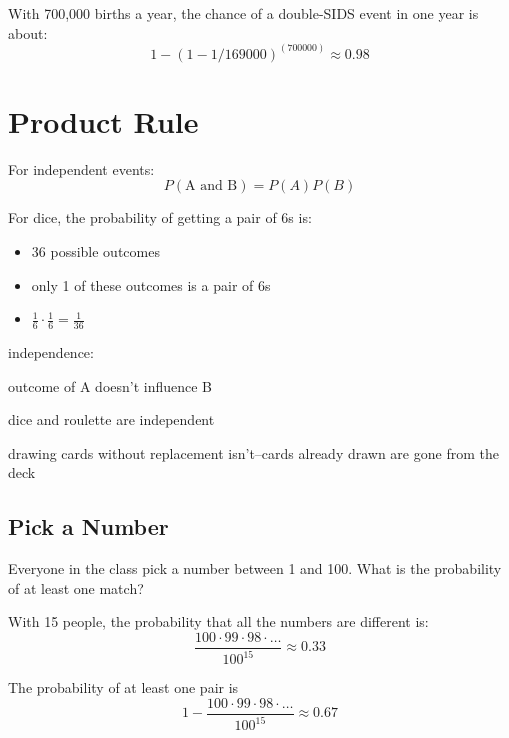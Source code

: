 \documentclass[landscape]{exam}
\begin{document}
  With 700,000 births a year, the chance of a double-SIDS event in one year is
  about:
  \[
    1 - (1 - 1/169000)^(700000) \approx 0.98
  \]

  \section{Product Rule}

  For independent events:
  \[
    P(\text{A and B}) = P(A) P(B)
  \]

  For dice, the probability of getting a pair of 6s is:
  \begin{itemize}
    \item 36 possible outcomes
    \item only 1 of these outcomes is a pair of 6s
    \item $\frac{1}{6} \cdot \frac{1}{6} = \frac{1}{36}$
  \end{itemize}


  independence:
  \begin{itemize*}
    \item outcome of A doesn't influence B
    \item dice and roulette are independent
    \item drawing cards without replacement isn't--cards already drawn are gone
      from the deck
  \end{itemize*}

  \subsection{Pick a Number}
  Everyone in the class pick a number between 1 and 100. What is the probability
  of at least one match?

  \begin{solution}
    With 15 people, the probability that all the numbers are different is:
    \[
      \frac{100 \cdot 99 \cdot 98 \cdot \ldots}{100^15} \approx 0.33
    \]

    The probability of at least one pair is
    \[
      1 - \frac{100 \cdot 99 \cdot 98 \cdot \ldots}{100^15} \approx \boxed{ 0.67 }
    \]
  \end{solution}
\end{document}

